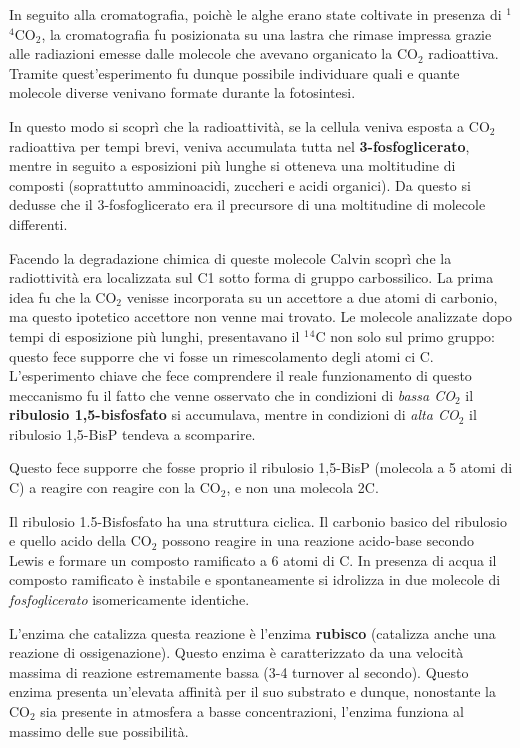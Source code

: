 \documentclass[]{article}
\begin{document}
In seguito alla cromatografia, poichè le alghe erano state coltivate in
presenza di $^1$$^4$CO$_2$, la cromatografia fu posizionata su una
lastra che rimase impressa grazie alle radiazioni emesse dalle molecole
che avevano organicato la CO$_2$ radioattiva. Tramite quest'esperimento
fu dunque possibile individuare quali e quante molecole diverse venivano
formate durante la fotosintesi.

In questo modo si scoprì che la radioattività, se la cellula veniva
esposta a CO$_2$ radioattiva per tempi brevi, veniva accumulata tutta
nel \textbf{3-fosfoglicerato}, mentre in seguito a esposizioni più
lunghe si otteneva una moltitudine di composti (soprattutto amminoacidi,
zuccheri e acidi organici). Da questo si dedusse che il 3-fosfoglicerato
era il precursore di una moltitudine di molecole differenti.

Facendo la degradazione chimica di queste molecole Calvin scoprì che la
radiottività era localizzata sul C1 sotto forma di gruppo carbossilico.
La prima idea fu che la CO$_2$ venisse incorporata su un accettore a due
atomi di carbonio, ma questo ipotetico accettore non venne mai trovato.
Le molecole analizzate dopo tempi di esposizione più lunghi,
presentavano il $^1$$^4$C non solo sul primo gruppo: questo fece
supporre che vi fosse un rimescolamento degli atomi ci C. L'esperimento
chiave che fece comprendere il reale funzionamento di questo meccanismo
fu il fatto che venne osservato che in condizioni di \emph{bassa CO$_2$}
il \textbf{ribulosio 1,5-bisfosfato} si accumulava, mentre in condizioni
di \emph{alta CO$_2$} il ribulosio 1,5-BisP tendeva a scomparire.

Questo fece supporre che fosse proprio il ribulosio 1,5-BisP (molecola a
5 atomi di C) a reagire con reagire con la CO$_2$, e non una molecola
2C.

Il ribulosio 1.5-Bisfosfato ha una struttura ciclica. Il carbonio basico
del ribulosio e quello acido della CO$_2$ possono reagire in una
reazione acido-base secondo Lewis e formare un composto ramificato a 6
atomi di C. In presenza di acqua il composto ramificato è instabile e
spontaneamente si idrolizza in due molecole di \emph{fosfoglicerato}
isomericamente identiche.

L'enzima che catalizza questa reazione è l'enzima \textbf{rubisco}
(catalizza anche una reazione di ossigenazione). Questo enzima è
caratterizzato da una velocità massima di reazione estremamente bassa
(3-4 turnover al secondo). Questo enzima presenta un'elevata affinità
per il suo substrato e dunque, nonostante la CO$_2$ sia presente in
atmosfera a basse concentrazioni, l'enzima funziona al massimo delle sue
possibilità.
\end{document}
